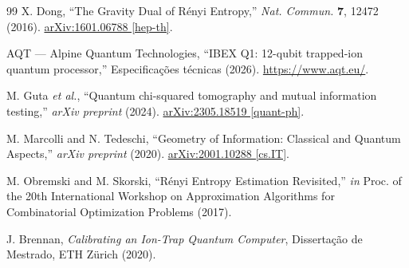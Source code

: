 \documentclass[12pt,a4paper,oneside]{book}
\theoremstyle{definition}
\theoremstyle{remark}
\begin{document}
\begin{thebibliography}{99}
X. Dong,
``The Gravity Dual of Rényi Entropy,''
\textit{Nat. Commun.} \textbf{7}, 12472 (2016).
\href{https://arxiv.org/abs/1601.06788}{arXiv:1601.06788 [hep-th]}.

AQT — Alpine Quantum Technologies,
``IBEX Q1: 12-qubit trapped-ion quantum processor,''
Especificações técnicas (2026).
\url{https://www.aqt.eu/}.

M. Guta \textit{et al.},
``Quantum chi-squared tomography and mutual information testing,''
\textit{arXiv preprint} (2024).
\href{https://arxiv.org/abs/2305.18519}{arXiv:2305.18519 [quant-ph]}.

M. Marcolli and N. Tedeschi,
``Geometry of Information: Classical and Quantum Aspects,''
\textit{arXiv preprint} (2020).
\href{https://arxiv.org/abs/2001.10288}{arXiv:2001.10288 [cs.IT]}.

M. Obremski and M. Skorski,
``Rényi Entropy Estimation Revisited,''
\textit{in} Proc. of the 20th International Workshop on Approximation Algorithms for Combinatorial Optimization Problems (2017).

J. Brennan,
\textit{Calibrating an Ion-Trap Quantum Computer},
Dissertação de Mestrado, ETH Zürich (2020).

\end{thebibliography}
\end{document}
